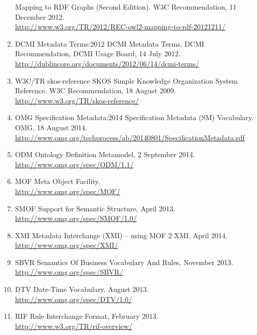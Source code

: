 \documentclass[10pt, a4paper]{isov2}
\begin{document}
\begin{enumerate}[label=\bfseries NR\arabic*, noitemsep]
{Mapping to RDF Graphs (Second Edition).  W3C Recommendation, 11 December 2012.\\ \url{http://www.w3.org/TR/2012/REC-owl2-mapping-to-rdf-20121211/}}\label{nref-OWL2RDF}
  \item{DCMI Metadata Terms:2012} {DCMI Metadata Terms, DCMI Recommendation, DCMI Usage Board, 14 July 2012.\\
     \url{http://dublincore.org/documents/2012/06/14/dcmi-terms/}}\label{nref-DCMI}
  \item{W3C/TR skos-reference} {SKOS Simple Knowledge Organization System
Reference.  W3C Recommendation, 18 August 2009.\\ \url{http://www.w3.org/TR/skos-reference/}}\label{nref-SKOS}
  \item{OMG Specification Metadata:2014} {Specification Metadata (SM) Vocabulary.  OMG, 18 August 2014.\\
\url{http://www.omg.org/techprocess/ab/20140801/SpecificationMetadata.rdf}}\label{nref-OMG-SM}
  \item{ODM} {Ontology Definition Metamodel, 2 September 2014. \\ \url{http://www.omg.org/spec/ODM/1.1/}}\label{nref-ODM}
\item{MOF} { Meta Object Facility.} \\ \url{http://www.omg.org/spec/MOF/}\label{nref-MOF}
\item{SMOF} { Support for Semantic Structure, April 2013.} \\ \url{http://www.omg.org/spec/SMOF/1.0/}\label{nref-SMOF}
\item{XMI} {Metadata Interchange (XMI) – using MOF 2 XMI, April 2014.} \\ \url{http://www.omg.org/spec/XMI/}\label{nref-XMI}
\item{SBVR} {Semantics Of Business Vocabulary And Rules, November 2013.} \\ \url{http://www.omg.org/spec/SBVR/}\label{nref-SBVR}
\item{DTV} {Date-Time Vocabulary, August 2013.} \\ \url{http://www.omg.org/spec/DTV/1.0/}\label{nref-DTV}
\item{RIF} {Rule Interchange Format, February 2013.} \\ \url{http://www.w3.org/TR/rif-overview/}\label{nref-RIF}
\end{enumerate}
%
\renewcommand*{\UrlFont}{\normalsize}
\end{document}
